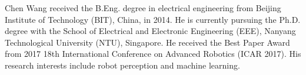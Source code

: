 \documentclass[journal]{IEEEtran}
\begin{document}



% 




\begin{IEEEbiography}{Chen Wang}
	received the B.Eng. degree in electrical engineering from Beijing Institute of Technology (BIT), China, in 2014. He is currently pursuing the Ph.D. degree with the  School of Electrical and Electronic Engineering (EEE), Nanyang Technological University (NTU), Singapore.
	He received the Best Paper Award from 2017 18th International Conference on Advanced Robotics (ICAR 2017).
	His research interests include robot perception and machine learning.
\end{IEEEbiography}
\end{document}
